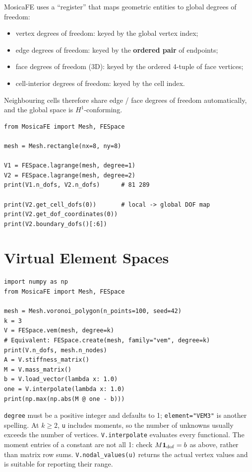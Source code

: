 \documentclass[11pt,oneside]{book}
\theoremstyle{definition}
\theoremstyle{plain}
\newcommand{\mosica}{\textsf{MosicaFE}}
\newcommand{\code}[1]{\texttt{#1}}
\begin{document}
\mosica{} uses a ``register'' that maps geometric entities to global degrees of
freedom:

\begin{itemize}[itemsep=0.15em]
  \item vertex degrees of freedom: keyed by the global vertex index;
  \item edge degrees of freedom: keyed by the \textbf{ordered pair} of endpoints;
  \item face degrees of freedom (3D): keyed by the ordered 4-tuple of face vertices;
  \item cell-interior degrees of freedom: keyed by the cell index.
\end{itemize}

Neighbouring cells therefore share edge / face degrees of freedom automatically, and
the global space is $H^1$-conforming.

\begin{lstlisting}[language=MosicaFE,caption={Creating spaces and inspecting the degrees of freedom}]
from MosicaFE import Mesh, FESpace

mesh = Mesh.rectangle(nx=8, ny=8)

V1 = FESpace.lagrange(mesh, degree=1)
V2 = FESpace.lagrange(mesh, degree=2)
print(V1.n_dofs, V2.n_dofs)      # 81 289

print(V2.get_cell_dofs(0))       # local -> global DOF map
print(V2.get_dof_coordinates(0))
print(V2.boundary_dofs()[:6])
\end{lstlisting}

\section{Virtual Element Spaces}

\begin{lstlisting}[language=MosicaFE,caption={Arbitrary-order VEM space and constant-function check}]
import numpy as np
from MosicaFE import Mesh, FESpace

mesh = Mesh.voronoi_polygon(n_points=100, seed=42)
k = 3
V = FESpace.vem(mesh, degree=k)
# Equivalent: FESpace.create(mesh, family="vem", degree=k)
print(V.n_dofs, mesh.n_nodes)
A = V.stiffness_matrix()
M = V.mass_matrix()
b = V.load_vector(lambda x: 1.0)
one = V.interpolate(lambda x: 1.0)
print(np.max(np.abs(M @ one - b)))
\end{lstlisting}

\code{degree} must be a positive integer and defaults to 1; \code{element="VEM3"}
is another spelling. At $k\ge2$, \code{u} includes moments, so the number of unknowns
usually exceeds the number of vertices. \code{V.interpolate} evaluates every
functional. The moment entries of a constant are not all 1: check $M\mathbf 1_{\rm dof}=b$
as above, rather than matrix row sums. \code{V.nodal\_\allowbreak values(u)} returns the actual
vertex values and is suitable for reporting their range.
\end{document}
